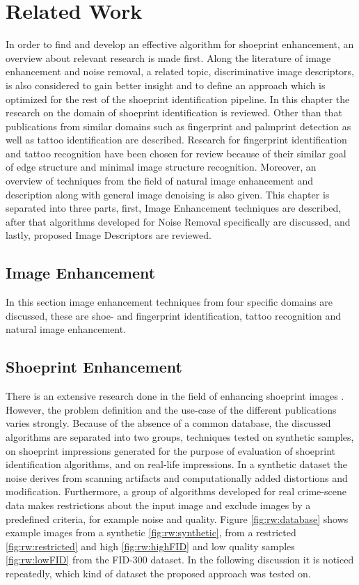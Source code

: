 \documentclass[draft,final]{vutinfth} %
\begin{document}
\chapter{Related Work}
\par
In order to find and develop an effective algorithm for shoeprint enhancement, an overview about relevant research is made first.
Along the literature of image enhancement and noise removal, a related topic, discriminative image descriptors, is also considered to gain better insight and to define an approach which is optimized for the rest of the shoeprint identification pipeline.
In this chapter the research on the domain of shoeprint identification is reviewed.
Other than that publications from similar domains such as fingerprint and palmprint detection as well as tattoo identification are described.
Research for fingerprint identification and tattoo recognition have been chosen for review because of their similar goal of edge structure and minimal image structure recognition.
Moreover, an overview of techniques from the field of natural image enhancement and description along with general image denoising is also given.
This chapter is separated into three parts, first, Image Enhancement techniques are described, after that algorithms developed for Noise Removal specifically are discussed, and lastly, proposed Image Descriptors are reviewed.


\section{Image Enhancement}
\label{sec:rw:ImageENhancement}

In this section image enhancement techniques from four specific domains are discussed, these are shoe- and fingerprint identification, tattoo recognition and natural image enhancement.

\section*{Shoeprint Enhancement}

\par
There is an extensive research done in the field of enhancing shoeprint images \cite{rida2019forensic}.
However,  the problem definition and the use-case of the different publications varies strongly.
Because of the absence of a common database, the discussed algorithms are separated into two groups, techniques tested on synthetic samples, on shoeprint impressions generated for the purpose of evaluation of shoeprint identification algorithms, and on real-life impressions.
In a synthetic dataset the noise derives from scanning artifacts and computationally added distortions and modification.
Furthermore, a group of algorithms developed for real crime-scene data makes restrictions about the input image and exclude images by a predefined criteria, for example noise and quality.
Figure \ref{fig:rw:database} shows example images from a synthetic \ref{fig:rw:synthetic}, from a restricted \ref{fig:rw:restricted} and high \ref{fig:rw:highFID} and low quality samples \ref{fig:rw:lowFID} from the FID-300 dataset.
In the following discussion it is noticed repeatedly, which kind of dataset the proposed approach was tested on.
\end{document}
